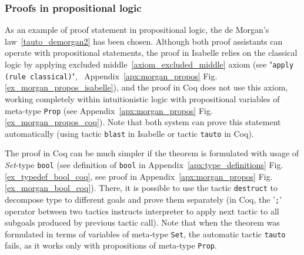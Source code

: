 \documentclass[article]{aaltoseries}
\begin{document}


\subsubsection{Proofs in propositional logic}

As an example of proof statement in propositional logic, the de Morgan's law~\eqref{tauto_demorgan2} has been chosen. Although both proof assistants can operate with propositional statements, the proof in Isabelle relies on the classical logic by applying excluded middle~\eqref{axiom_excluded_middle} axiom (see "\texttt{apply (rule classical)}", ~Appendix~\ref{apx:morgan_propos} Fig.\ref{ex_morgan_propos_isabelle}), and the proof in Coq does not use this axiom, working completely within intuitionistic logic with propositional variables of meta-type \texttt{Prop} (see Appendix~\ref{apx:morgan_propos} Fig.\ref{ex_morgan_propos_coq}). Note that both system can prove this statement automatically (using tactic \texttt{blast} in Isabelle or tactic \texttt{tauto} in Coq).
 


The proof in Coq can be much simpler if the theorem is formulated with usage of \textit{Set}-type \texttt{bool} (see definition of \texttt{bool} in Appendix~\ref{apx:type_definitions} Fig.\ref{ex_typedef_bool_coq}, see proof in Appendix~\ref{apx:morgan_propos} Fig.\ref{ex_morgan_bool_coq}). There, it is possible to use the tactic \texttt{destruct} to decompose type to different goals and prove them separately (in Coq, the '\texttt{;}' operator between two tactics instructs interpreter to apply next tactic to all subgoals produced by previous tactic call). Note that when the theorem was formulated in terms of variables of meta-type \texttt{Set}, the automatic tactic \texttt{tauto} fails, as it works only with propositions of meta-type \texttt{Prop}.

\end{document}
